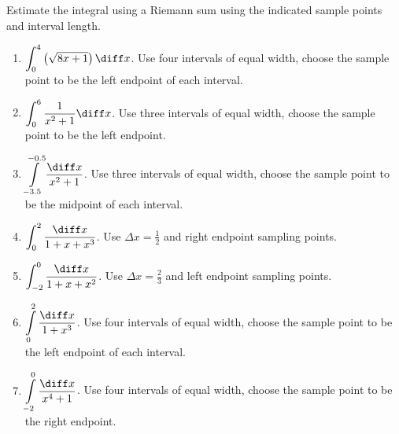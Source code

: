 Estimate the integral using a Riemann sum using the indicated sample points and interval length.
\begin{enumerate}[ref={\fcProblemRef}]
\item\label{problemRiemannSum-sqrt(8x+1)} $\displaystyle \int_0^4 \left(\sqrt{8x+1}\right)\diff x$. Use four intervals of equal width, choose the sample point to be the left endpoint of each interval. 


\item $\displaystyle \int_0^6 \frac{1}{x^2+1} \diff x$. Use three intervals of equal width, choose the sample point to be the left endpoint. 

\item\label{problemRiemannSum-1div1plusxsquared} $\displaystyle \int\limits_{-3.5}^{-0.5} \frac{\diff x}{x^2+1} $. Use three intervals of equal width, choose the sample point to be the midpoint of each interval. 


\item $\displaystyle\int_{0}^2 \frac{\diff x}{1+x+x^3}$. Use $\Delta x=\frac{1}2 $ and right endpoint sampling points.

\item $\displaystyle\int_{-2}^{0} \frac{\diff x}{1+x+x^2}$. Use $\Delta x=\frac23 $ and left endpoint sampling points.


\item $\displaystyle \int\limits_0^2 \frac{\diff x}{1+x^3}$. Use four intervals of equal width, choose the sample point to be the left endpoint of each interval. 


\item $\displaystyle \int\limits_{-2}^{0} \frac{\diff x}{x^4+1} $. Use four intervals of equal width, choose the sample point to be the right endpoint. 


\end{enumerate}


